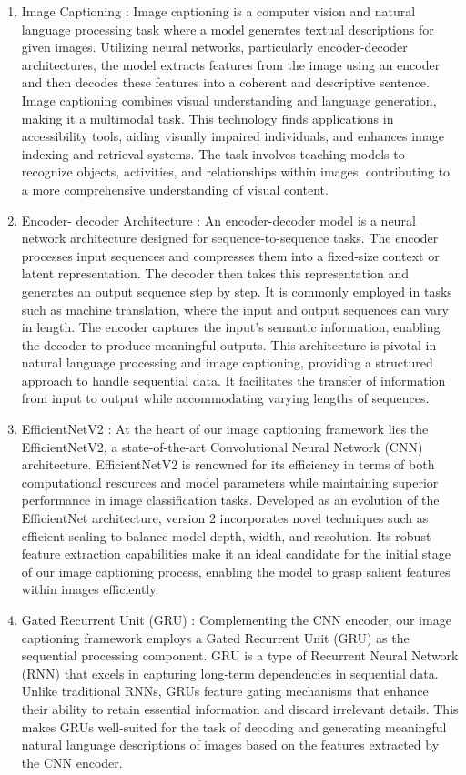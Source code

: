 \documentclass[oneside,a4paper,12pt]{report}
\begin{document}
\begin{enumerate}
\item{Image Captioning : }
Image captioning is a computer vision and natural language processing task where a model generates textual descriptions for given images. Utilizing neural networks, particularly encoder-decoder architectures, the model extracts features from the image using an encoder and then decodes these features into a coherent and descriptive sentence. Image captioning combines visual understanding and language generation, making it a multimodal task. This technology finds applications in accessibility tools, aiding visually impaired individuals, and enhances image indexing and retrieval systems. The task involves teaching models to recognize objects, activities, and relationships within images, contributing to a more comprehensive understanding of visual content.
\item {Encoder- decoder Architecture : }
An encoder-decoder model is a neural network architecture designed for sequence-to-sequence tasks. The encoder processes input sequences and compresses them into a fixed-size context or latent representation. The decoder then takes this representation and generates an output sequence step by step. It is commonly employed in tasks such as machine translation, where the input and output sequences can vary in length. The encoder captures the input's semantic information, enabling the decoder to produce meaningful outputs. This architecture is pivotal in natural language processing and image captioning, providing a structured approach to handle sequential data. It facilitates the transfer of information from input to output while accommodating varying lengths of sequences.
\item{EfficientNetV2 : }
At the heart of our image captioning framework lies the EfficientNetV2, a state-of-the-art Convolutional Neural Network (CNN) architecture. EfficientNetV2 is renowned for its efficiency in terms of both computational resources and model parameters while maintaining superior performance in image classification tasks. Developed as an evolution of the EfficientNet architecture, version 2 incorporates novel techniques such as efficient scaling to balance model depth, width, and resolution. Its robust feature extraction capabilities make it an ideal candidate for the initial stage of our image captioning process, enabling the model to grasp salient features within images efficiently.

\item{Gated Recurrent Unit (GRU) : }
Complementing the CNN encoder, our image captioning framework employs a Gated Recurrent Unit (GRU) as the sequential processing component. GRU is a type of Recurrent Neural Network (RNN) that excels in capturing long-term dependencies in sequential data. Unlike traditional RNNs, GRUs feature gating mechanisms that enhance their ability to retain essential information and discard irrelevant details. This makes GRUs well-suited for the task of decoding and generating meaningful natural language descriptions of images based on the features extracted by the CNN encoder.


\end{enumerate}
\end{document}
